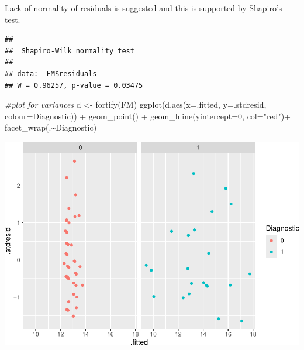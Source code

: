 \documentclass[
]{article}
\newenvironment{Shaded}{\begin{snugshade}}{\end{snugshade}}
\newcommand{\AttributeTok}[1]{\textcolor[rgb]{0.77,0.63,0.00}{#1}}
\newcommand{\CommentTok}[1]{\textcolor[rgb]{0.56,0.35,0.01}{\textit{#1}}}
\newcommand{\DecValTok}[1]{\textcolor[rgb]{0.00,0.00,0.81}{#1}}
\newcommand{\FunctionTok}[1]{\textcolor[rgb]{0.00,0.00,0.00}{#1}}
\newcommand{\NormalTok}[1]{#1}
\newcommand{\OtherTok}[1]{\textcolor[rgb]{0.56,0.35,0.01}{#1}}
\newcommand{\SpecialCharTok}[1]{\textcolor[rgb]{0.00,0.00,0.00}{#1}}
\newcommand{\StringTok}[1]{\textcolor[rgb]{0.31,0.60,0.02}{#1}}
\begin{document}
Lack of normality of residuals is suggested and this is supported by
Shapiro's test.

\begin{Shaded}
\end{Shaded}

\begin{verbatim}
## 
##  Shapiro-Wilk normality test
## 
## data:  FM$residuals
## W = 0.96257, p-value = 0.03475
\end{verbatim}

\begin{Shaded}
\begin{Highlighting}[]
\CommentTok{\#plot for variances}
\NormalTok{d }\OtherTok{\textless{}{-}} \FunctionTok{fortify}\NormalTok{(FM)}
\FunctionTok{ggplot}\NormalTok{(d,}\FunctionTok{aes}\NormalTok{(}\AttributeTok{x=}\NormalTok{.fitted, }\AttributeTok{y=}\NormalTok{.stdresid, }\AttributeTok{colour=}\NormalTok{Diagnostic)) }\SpecialCharTok{+} 
  \FunctionTok{geom\_point}\NormalTok{() }\SpecialCharTok{+} 
  \FunctionTok{geom\_hline}\NormalTok{(}\AttributeTok{yintercept=}\DecValTok{0}\NormalTok{, }\AttributeTok{col=}\StringTok{"red"}\NormalTok{)}\SpecialCharTok{+}
  \FunctionTok{facet\_wrap}\NormalTok{(.}\SpecialCharTok{\textasciitilde{}}\NormalTok{Diagnostic)}
\end{Highlighting}
\end{Shaded}

\includegraphics{WorkingExample2_code_files/figure-latex/unnamed-chunk-9-1.pdf}
\end{document}
